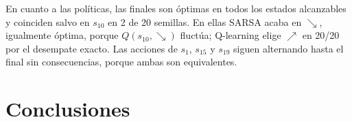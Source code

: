 \documentclass[11pt,a4paper]{article}
\newcommand{\UR}{{\nearrow}}
\newcommand{\DR}{{\searrow}}
\begin{document}
\begin{table}[H]\centering\normalsize\setlength{\tabcolsep}{2.8pt}



\caption{Valores finales (media temporal del último 25\,\%, 20 semillas; entre paréntesis, desviación típica temporal de SARSA) y visitas medianas $N$ (SARSA/QL). Estados inalcanzables omitidos: $Q=Q_0=0$ y $N=0$ en ambos.}

\label{tab:final}

\end{table}



En cuanto a las políticas, las finales son óptimas en todos los estados alcanzables y coinciden salvo en $s_{10}$ en 2 de 20 semillas. En ellas SARSA acaba en $\DR$, igualmente óptima, porque $Q(s_{10},\DR)$ fluctúa; Q-learning elige $\UR$ en 20/20 por el desempate exacto. Las acciones de $s_1$, $s_{15}$ y $s_{19}$ siguen alternando hasta el final sin consecuencias, porque ambas son equivalentes.



\newpage
\section{Conclusiones}
\end{document}

